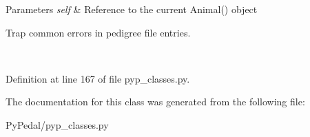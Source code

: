 \begin{DoxyParams}{Parameters}
{\em self} & Reference to the current Animal() object \begin{DoxyVerb}Trap common errors in pedigree file entries.\end{DoxyVerb}
 \\
\hline
\end{DoxyParams}


Definition at line 167 of file pyp\_\-classes.py.



The documentation for this class was generated from the following file:\begin{DoxyCompactItemize}
\item 
PyPedal/pyp\_\-classes.py\end{DoxyCompactItemize}
